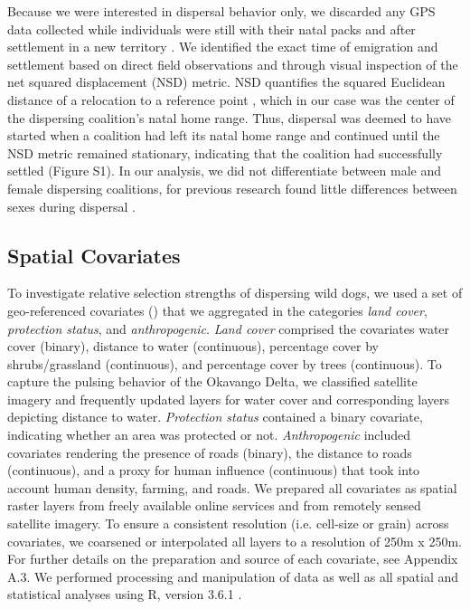 \documentclass[abstract=on,10pt,a4paper,bibliography=totocnumbered]{article}
\begin{document}
Because we were interested in dispersal behavior only, we discarded any GPS data
collected while individuals were still with their natal packs and after
settlement in a new territory \citep{Cozzi.2020}. We identified the exact time
of emigration and settlement based on direct field observations and through
visual inspection of the net squared displacement (NSD) metric. NSD quantifies
the squared Euclidean distance of a relocation to a reference point
\citep{Borger.2012}, which in our case was the center of the dispersing
coalition's natal home range. Thus, dispersal was deemed to have started when a
coalition had left its natal home range and continued until the NSD metric
remained stationary, indicating that the coalition had successfully settled
(Figure S1). In our analysis, we did not differentiate between male and female
dispersing coalitions, for previous research found little differences between
sexes during dispersal \citep{Woodroffe.2019, Cozzi.2020}.

\subsection{Spatial Covariates}
To investigate relative selection strengths of dispersing wild dogs, we used a
set of geo-referenced covariates () that we aggregated in the
categories \textit{land cover}, \textit{protection status}, and
\textit{anthropogenic}. \textit{Land cover} comprised the covariates water cover
(binary), distance to water (continuous), percentage cover by shrubs/grassland
(continuous), and percentage cover by trees (continuous). To capture the pulsing
behavior of the Okavango Delta, we classified satellite imagery and frequently
updated layers for water cover and corresponding layers depicting distance to
water. \textit{Protection status} contained a binary covariate, indicating
whether an area was protected or not. \textit{Anthropogenic} included covariates
rendering the presence of roads (binary), the distance to roads (continuous),
and a proxy for human influence (continuous) that took into account human
density, farming, and roads. We prepared all covariates as spatial raster layers
from freely available online services and from remotely sensed satellite
imagery. To ensure a consistent resolution (i.e. cell-size or grain) across
covariates, we coarsened or interpolated all layers to a resolution of 250m x
250m. For further details on the preparation and source of each covariate, see
Appendix A.3. We performed processing and manipulation of data as well as all
spatial and statistical analyses using R, version 3.6.1 \citep{R.2019}.
\end{document}
